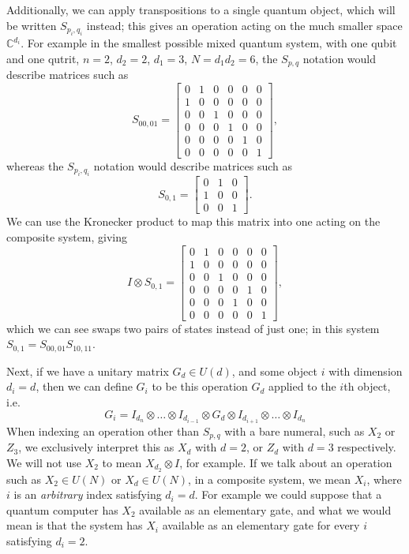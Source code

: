 Additionally, we can apply transpositions to a single quantum object, which will be written $S_{p_i,q_i}$ instead; this gives an operation acting on the much smaller space $\mathbb{C}^{d_i}$. For example in the smallest possible mixed quantum system, with one qubit and one qutrit, $n=2$, $d_2 = 2$, $d_1 = 3$, $N = d_1d_2 = 6$, the $S_{p,q}$ notation would describe matrices such as
\[S_{00,01} = \begin{bmatrix}
0 & 1 & 0 & 0 & 0 & 0 \\
1 & 0 & 0 & 0 & 0 & 0 \\
0 & 0 & 1 & 0 & 0 & 0 \\
0 & 0 & 0 & 1 & 0 & 0 \\
0 & 0 & 0 & 0 & 1 & 0 \\
0 & 0 & 0 & 0 & 0 & 1
\end{bmatrix},\] 
whereas the $S_{p_i,q_i}$ notation would describe matrices such as
\[S_{0,1} = \begin{bmatrix}
0 & 1 & 0 \\
1 & 0 & 0 \\
0 & 0 & 1
\end{bmatrix}.\]
We can use the Kronecker product to map this matrix into one acting on the composite system, giving
\[I \otimes S_{0,1} = \begin{bmatrix}
0 & 1 & 0 & 0 & 0 & 0 \\
1 & 0 & 0 & 0 & 0 & 0 \\
0 & 0 & 1 & 0 & 0 & 0 \\
0 & 0 & 0 & 0 & 1 & 0 \\
0 & 0 & 0 & 1 & 0 & 0 \\
0 & 0 & 0 & 0 & 0 & 1
\end{bmatrix},\]
which we can see swaps two pairs of states instead of just one; in this system $S_{0,1} = S_{00,01} S_{10,11}$.

Next, if we have a unitary matrix $G_{d} \in U(d)$, and some object $i$ with dimension $d_i = d$, then we can define $G_i$ to be this operation $G_d$ applied to the $i$th object, i.e. 
\[G_i = I_{d_n}\otimes \dots \otimes I_{d_{i-1}} \otimes G_d \otimes I_{d_{i+1}} \otimes \dots \otimes I_{d_n}\]
When indexing an operation other than $S_{p,q}$ with a bare numeral, such as $X_2$ or $Z_3$, we exclusively interpret this as $X_d$ with $d = 2$, or $Z_d$ with $d = 3$ respectively. We will not use $X_2$ to mean $X_{d_2} \otimes I$, for example. If we talk about an operation such as  $X_2 \in U(N)$ or $X_d \in U(N)$, in a composite system, we mean $X_i$, where $i$ is an \emph{arbitrary} index satisfying $d_i = d$. For example we could suppose that a quantum computer has $X_2$ available as an elementary gate, and what we would mean is that the system has $X_i$ available as an elementary gate for every $i$ satisfying $d_i = 2$.

